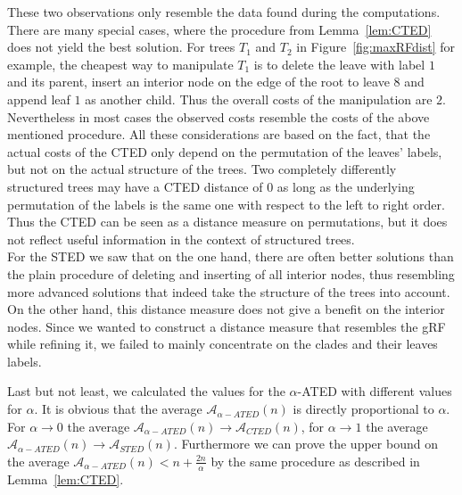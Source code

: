 These two observations only resemble the data found during the computations. There are many special cases, where the procedure from Lemma~\ref{lem:CTED} does not yield the best solution. For trees $T_1$ and $T_2$ in Figure~\ref{fig:maxRFdist} for example, the cheapest way to manipulate $T_1$ is to delete the leave with label $1$ and its parent, insert an interior node on the edge of the root to leave $8$ and append leaf $1$ as another child. Thus the overall costs of the manipulation are $2$. Nevertheless in most cases the observed costs resemble the costs of the above mentioned procedure. All these considerations are based on the fact, that the actual costs of the CTED only depend on the permutation of the leaves' labels, but not on the actual structure of the trees. Two completely differently structured trees may have a CTED distance of $0$ as long as the underlying permutation of the labels is the same one with respect to the left to right order. Thus the CTED can be seen as a distance measure on permutations, but it does not reflect useful information in the context of structured trees.\\
For the STED we saw that on the one hand, there are often better solutions than the plain procedure of deleting and inserting of all interior nodes, thus resembling more advanced solutions that indeed take the structure of the trees into account. On the other hand, this distance measure does not give a benefit on the interior nodes. Since we wanted to construct a distance measure that resembles the gRF while refining it, we failed to mainly concentrate on the clades and their leaves labels.

Last but not least, we calculated the values for the $\alpha$-ATED with different values for $\alpha$. It is obvious that the average $\mathcal{A}_{\alpha -ATED}(n)$ is directly proportional to $\alpha$. For $\alpha \to 0$ the average $\mathcal{A}_{\alpha -ATED}(n) \to \mathcal{A}_{CTED}(n)$, for $\alpha \to 1$ the average $\mathcal{A}_{\alpha -ATED}(n) \to \mathcal{A}_{STED}(n)$. Furthermore we can prove the upper bound on the average $\mathcal{A}_{\alpha -ATED}(n) < n +\frac{2n}{\alpha}$ by the same procedure as described in Lemma~\ref{lem:CTED}.
